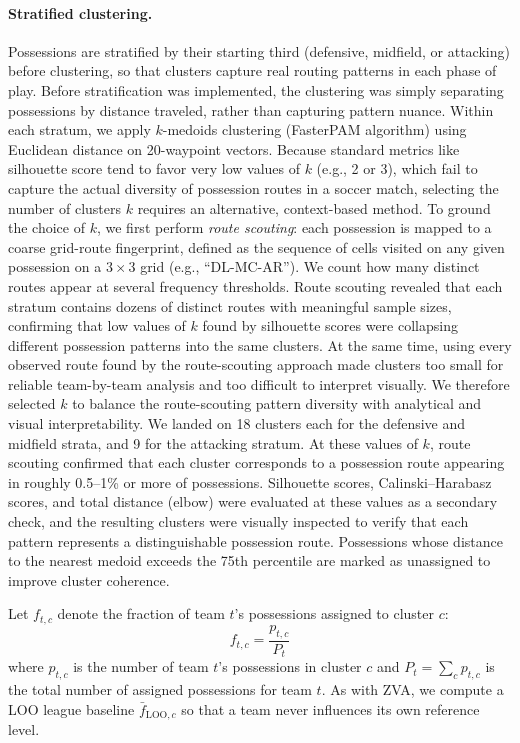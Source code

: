 \documentclass[12pt,a4paper]{article}
\begin{document}
\paragraph{Stratified clustering.}
Possessions are stratified by their starting third (defensive, midfield, or attacking) before clustering, so that clusters capture real routing patterns in each phase of play. Before stratification was implemented, the clustering was simply separating possessions by distance traveled, rather than capturing pattern nuance. Within each stratum, we apply $k$-medoids clustering (FasterPAM algorithm) using Euclidean distance on 20-waypoint vectors. Because standard metrics like silhouette score tend to favor very low values of $k$ (e.g., 2 or 3), which fail to capture the actual diversity of possession routes in a soccer match, selecting the number of clusters $k$ requires an alternative, context-based method. To ground the choice of $k$, we first perform \emph{route scouting}: each possession is mapped to a coarse grid-route fingerprint, defined as the sequence of cells visited on any given possession on a $3 \times 3$ grid (e.g., ``DL-MC-AR''). We count how many distinct routes appear at several frequency thresholds. Route scouting revealed that each stratum contains dozens of distinct routes with meaningful sample sizes, confirming that low values of $k$ found by silhouette scores were collapsing different possession patterns into the same clusters. At the same time, using every observed route found by the route-scouting approach made clusters too small for reliable team-by-team analysis and too difficult to interpret visually. We therefore selected $k$ to balance the route-scouting pattern diversity with analytical and visual interpretability. We landed on 18 clusters each for the defensive and midfield strata, and 9 for the attacking stratum. At these values of $k$, route scouting confirmed that each cluster corresponds to a possession route appearing in roughly 0.5--1\% or more of possessions. Silhouette scores, Calinski--Harabasz scores, and total distance (elbow) were evaluated at these values as a secondary check, and the resulting clusters were visually inspected to verify that each pattern represents a distinguishable possession route. Possessions whose distance to the nearest medoid exceeds the 75th percentile are marked as unassigned to improve cluster coherence.

Let $f_{t,c}$ denote the fraction of team $t$’s possessions assigned to cluster $c$:
\begin{equation}
f_{t,c} = \frac{p_{t,c}}{P_t}
\end{equation}
where $p_{t,c}$ is the number of team $t$’s possessions in cluster $c$ and $P_t = \sum_c p_{t,c}$ is the total number of assigned possessions for team $t$. As with ZVA, we compute a LOO league baseline $\bar{f}_{\text{LOO},c}$ so that a team never influences its own reference level.
\end{document}
